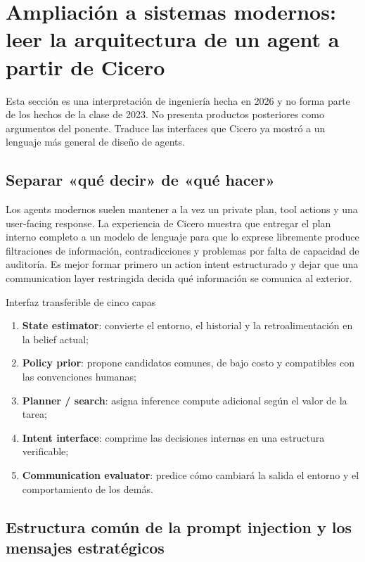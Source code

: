 \section{Ampliación a sistemas modernos: leer la arquitectura de un agent a partir de Cicero}

Esta sección es una interpretación de ingeniería hecha en 2026 y no forma parte de los hechos de la clase de 2023. No presenta productos posteriores como argumentos del ponente. Traduce las interfaces que Cicero ya mostró a un lenguaje más general de diseño de agents.

\subsection{Separar «qué decir» de «qué hacer»}

Los agents modernos suelen mantener a la vez un private plan, tool actions y una user-facing response. La experiencia de Cicero muestra que entregar el plan interno completo a un modelo de lenguaje para que lo exprese libremente produce filtraciones de información, contradicciones y problemas por falta de capacidad de auditoría. Es mejor formar primero un action intent estructurado y dejar que una communication layer restringida decida qué información se comunica al exterior.

\begin{knowledgebox}{Interfaz transferible de cinco capas}
\begin{enumerate}
  \item \textbf{State estimator}: convierte el entorno, el historial y la retroalimentación en la belief actual;
  \item \textbf{Policy prior}: propone candidatos comunes, de bajo costo y compatibles con las convenciones humanas;
  \item \textbf{Planner / search}: asigna inference compute adicional según el valor de la tarea;
  \item \textbf{Intent interface}: comprime las decisiones internas en una estructura verificable;
  \item \textbf{Communication evaluator}: predice cómo cambiará la salida el entorno y el comportamiento de los demás.
\end{enumerate}
\end{knowledgebox}

\subsection{Estructura común de la prompt injection y los mensajes estratégicos}

